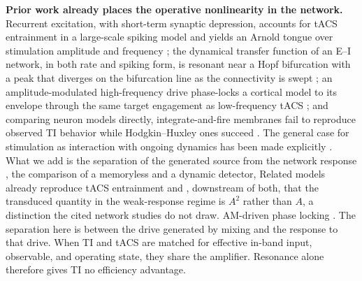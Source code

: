 \documentclass[11pt,a4paper]{article}
\providecommand{\DIFaddtex}[1]{{\protect\color{blue} \sf #1}} %
\providecommand{\DIFdeltex}[1]{{\protect\color{red} \scriptsize #1}} %
\providecommand{\DIFaddbegin}{} %
\providecommand{\DIFaddend}{} %
\providecommand{\DIFdelbegin}{} %
\providecommand{\DIFdelend}{} %
\providecommand{\DIFadd}[1]{\texorpdfstring{\DIFaddtex{#1}}{#1}} %
\providecommand{\DIFdel}[1]{\texorpdfstring{\DIFdeltex{#1}}{}} %
\begin{document}
\DIFdel{\textbf{Prior work already places the operative nonlinearity in the network.} Recurrent
excitation, with short-term synaptic depression, accounts for tACS entrainment in a
large-scale spiking model and yields an Arnold tongue over stimulation amplitude and
frequency \cite{ali2013}; the dynamical transfer function of an E--I network, in both rate
and spiking form, is resonant near a Hopf bifurcation with a peak that diverges on the
bifurcation line as the connectivity is swept \cite{ledoux2011}; an amplitude-modulated
high-frequency drive phase-locks a cortical model to its envelope through the same target
engagement as low-frequency tACS \cite{negahbani2018}; and comparing neuron models directly,
integrate-and-fire membranes fail to reproduce observed TI behavior while
Hodgkin--Huxley ones succeed \cite{plovie2025}. The general case for stimulation as
interaction with ongoing dynamics has been made explicitly \cite{krause2023}. What we add
is the separation of the generated source from the network response , the comparison of a
memoryless and a dynamic detector, }\DIFdelend \DIFaddbegin \DIFadd{Related models already reproduce tACS entrainment }\DIFaddend and \DIFdelbegin \DIFdel{, downstream of both, that the
transduced quantity
in the weak-response regime is $A^2$ rather than $A$, a distinction the cited network
studies do not draw. }\DIFdelend \DIFaddbegin \DIFadd{AM-driven phase locking
\cite{ali2013,negahbani2018,krause2023}. The separation here is between the drive
generated by mixing and the response to that drive. When TI and tACS are matched
for effective in-band input, observable, and operating state, they share the
amplifier. Resonance alone therefore gives TI no efficiency advantage.
}\DIFaddend
\end{document}
